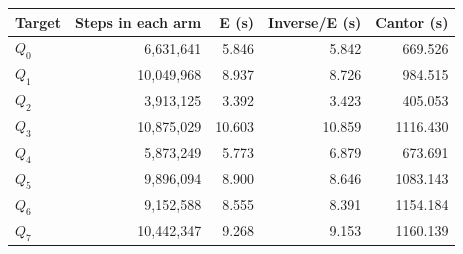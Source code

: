 \begin{tabular}{lrrrr}\toprule
Target & Steps in each arm & E (s) & Inverse/E (s) & Cantor (s)\\\midrule
$Q_0$ & 6,631,641 & 5.846 & 5.842 & 669.526 \\
$Q_1$ & 10,049,968 & 8.937 & 8.726 & 984.515 \\
$Q_2$ & 3,913,125 & 3.392 & 3.423 & 405.053 \\
$Q_3$ & 10,875,029 & 10.603 & 10.859 & 1116.430 \\
$Q_4$ & 5,873,249 & 5.773 & 6.879 & 673.691 \\
$Q_5$ & 9,896,094 & 8.900 & 8.646 & 1083.143 \\
$Q_6$ & 9,152,588 & 8.555 & 8.391 & 1154.184 \\
$Q_7$ & 10,442,347 & 9.268 & 9.153 & 1160.139 \\
\bottomrule\end{tabular}
